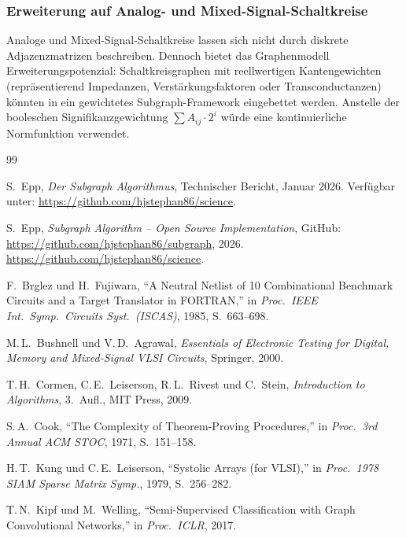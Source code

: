 ﻿\documentclass[a4paper,12pt]{article}
\theoremstyle{definition}
\begin{document}
\subsubsection{Erweiterung auf Analog- und Mixed-Signal-Schaltkreise}

Analoge und Mixed-Signal-Schaltkreise lassen sich nicht durch diskrete
Adjazenzmatrizen beschreiben. Dennoch bietet das Graphenmodell
Erweiterungspotenzial: Schaltkreisgraphen mit reellwertigen
Kantengewichten (repräsentierend Impedanzen, Verstärkungsfaktoren
oder Transconductanzen) könnten in ein gewichtetes Subgraph-Framework
eingebettet werden. Anstelle der booleschen Signifikanzgewichtung
$\sum A_{ij} \cdot 2^i$ würde eine kontinuierliche
Norm\-funktion verwendet.

\begin{thebibliography}{99}

S.~Epp, \textit{Der Subgraph Algorithmus}, Technischer Bericht, Januar 2026.
Verfügbar unter: \url{https://github.com/hjstephan86/science}.

S.~Epp, \textit{Subgraph Algorithm -- Open Source Implementation},
GitHub: \url{https://github.com/hjstephan86/subgraph}, 2026.
\url{https://github.com/hjstephan86/science}.

F.~Brglez und H.~Fujiwara, ``A Neutral Netlist of 10 Combinational
Benchmark Circuits and a Target Translator in FORTRAN,'' in
\textit{Proc.\ IEEE Int.\ Symp.\ Circuits Syst.\ (ISCAS)}, 1985,
S.~663--698.

M.\,L.~Bushnell und V.\,D.~Agrawal,
\textit{Essentials of Electronic Testing for Digital, Memory and
Mixed-Signal VLSI Circuits}, Springer, 2000.

T.\,H.~Cormen, C.\,E.~Leiserson, R.\,L.~Rivest und C.~Stein,
\textit{Introduction to Algorithms}, 3.~Aufl., MIT Press, 2009.

S.\,A.~Cook, ``The Complexity of Theorem-Proving Procedures,'' in
\textit{Proc.\ 3rd Annual ACM STOC}, 1971, S.~151--158.

H.\,T.~Kung und C.\,E.~Leiserson, ``Systolic Arrays (for VLSI),''
in \textit{Proc.\ 1978 SIAM Sparse Matrix Symp.}, 1979, S.~256--282.

T.\,N.~Kipf und M.~Welling, ``Semi-Supervised Classification with
Graph Convolutional Networks,'' in \textit{Proc.\ ICLR}, 2017.


\end{thebibliography}
\end{document}
